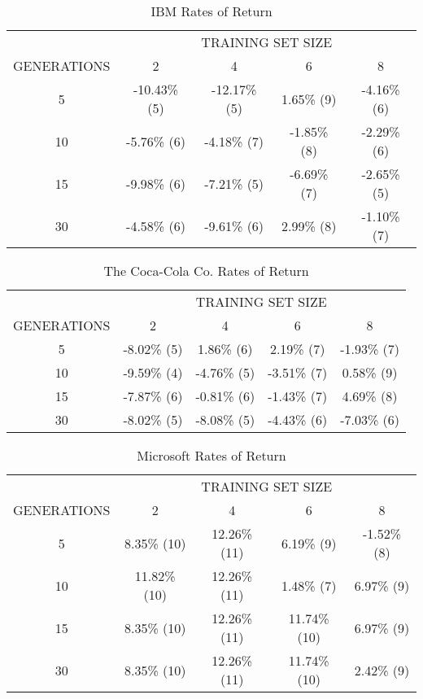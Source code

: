 \begin{table}
\caption{IBM Rates of Return}
\label{ibm-ror-table}
    \begin{tabular}{ c c c c c }
         & \multicolumn{4}{c}{TRAINING SET SIZE} \\ 
        GENERATIONS & 2            & 4           & 6             & 8           \\ 
        5           & -10.43\% (5) & -12.17\% (5) & 1.65\% (9) & -4.16\% (6) \\ 
        10          & -5.76\% (6)  & -4.18\% (7) & -1.85\% (8) & -2.29\% (6) \\ 
        15          & -9.98\% (6)  & -7.21\% (5) & -6.69\% (7)  & -2.65\% (5) \\ 
        30          & -4.58\% (6)  & -9.61\% (6) & 2.99\% (8)  & -1.10\% (7)  \\ 
    \end{tabular} 
\end{table}

\begin{table}
\caption{The Coca-Cola Co. Rates of Return}
\label{ko-ror-table}
    \begin{tabular}{ c c c c c }
         & \multicolumn{4}{c}{TRAINING SET SIZE} \\ 
        GENERATIONS & 2            & 4           & 6             & 8           \\ 
        5           & -8.02\% (5)  & 1.86\% (6)  & 2.19\% (7)    & -1.93\% (7) \\ 
        10          & -9.59\% (4)  & -4.76\% (5) & -3.51\% (7)   & 0.58\% (9) \\ 
        15          & -7.87\% (6)  & -0.81\% (6) & -1.43\% (7)   & 4.69\% (8) \\ 
        30          & -8.02\% (5)  & -8.08\% (5) & -4.43\% (6)   & -7.03\% (6)  \\ 
    \end{tabular} 
\end{table}

\begin{table}
\caption{Microsoft Rates of Return}
\label{msft-ror-table}
    \begin{tabular}{ c c c c c }
         & \multicolumn{4}{c}{TRAINING SET SIZE} \\ 
        GENERATIONS & 2            & 4           & 6             & 8           \\ 
        5           & 8.35\% (10)  & 12.26\% (11) & 6.19\% (9)   & -1.52\% (8) \\ 
        10          & 11.82\% (10) & 12.26\% (11) & 1.48\% (7)   & 6.97\% (9) \\ 
        15          & 8.35\% (10)  & 12.26\% (11) & 11.74\% (10) & 6.97\% (9) \\ 
        30          & 8.35\% (10)  & 12.26\% (11) & 11.74\% (10) & 2.42\% (9)  \\ 
    \end{tabular} 
\end{table}

